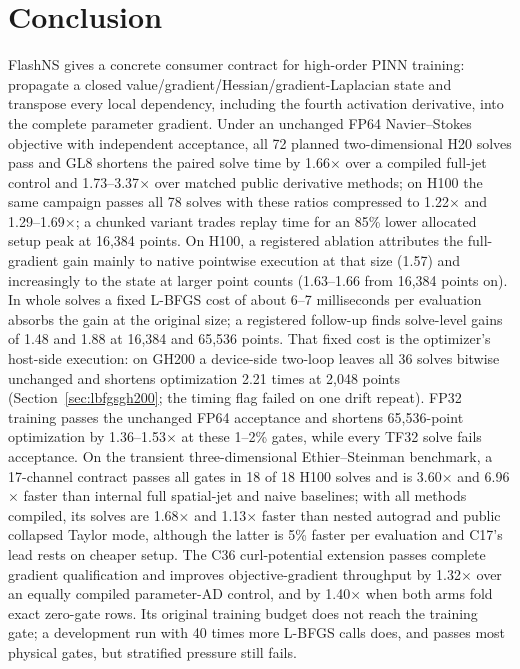 \documentclass[11pt]{article}
\begin{document}
\section{Conclusion}
FlashNS gives a concrete consumer contract for high-order PINN training:
propagate a closed value/gradient/Hessian/gradient-Laplacian state and
transpose every local dependency, including the fourth activation
derivative, into the complete parameter gradient. Under an unchanged FP64
Navier--Stokes objective with independent acceptance, all 72 planned
two-dimensional H20 solves pass and GL8 shortens the paired solve time by
1.66$\times$ over a compiled full-jet control and 1.73--3.37$\times$ over
matched public derivative methods; on H100 the same campaign passes all 78
solves with these ratios compressed to 1.22$\times$ and 1.29--1.69$\times$; a chunked variant trades replay time
for an 85\% lower allocated setup peak at 16,384 points. On H100, a
registered ablation attributes the full-gradient gain mainly to native
pointwise execution at that size (1.57) and increasingly to the state at
larger point counts (1.63--1.66 from 16,384 points on). In whole solves a
fixed L-BFGS cost of about 6--7 milliseconds per evaluation absorbs the
gain at the original size; a registered follow-up finds solve-level gains
of 1.48 and 1.88 at 16,384 and 65,536 points. That fixed cost is the
optimizer's host-side execution: on GH200 a device-side two-loop leaves all
36 solves bitwise unchanged and shortens optimization 2.21 times at 2,048
points (Section~\ref{sec:lbfgsgh200}; the timing flag failed on one drift
repeat). FP32 training passes the
unchanged FP64 acceptance and shortens 65,536-point optimization by
1.36--1.53$\times$ at these 1--2\% gates, while every TF32 solve fails
acceptance. On the transient
three-dimensional Ethier--Steinman benchmark, a 17-channel contract passes
all gates in 18 of 18 H100 solves and is 3.60$\times$ and 6.96$\times$
faster than internal full spatial-jet and naive baselines; with all
methods compiled, its solves are 1.68$\times$ and 1.13$\times$ faster than
nested autograd and public collapsed Taylor mode, although the latter is
5\% faster per evaluation and C17's lead rests on cheaper setup.
The C36 curl-potential
extension passes complete gradient qualification and improves
objective-gradient throughput by 1.32$\times$ over an equally compiled
parameter-AD control, and by 1.40$\times$ when both arms fold exact
zero-gate rows. Its original training budget does not reach the
training gate; a development run with 40 times more L-BFGS calls does, and
passes most physical gates, but stratified pressure still fails.
\end{document}
